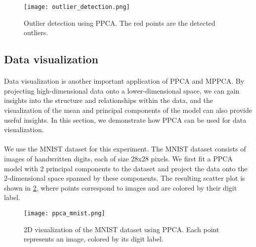 \documentclass{article}
\begin{document}
\begin{figure}[H]
    \centering
    \texttt{[image: outlier\_detection.png]}
    \caption{Outlier detection using PPCA. The red points are the detected outliers.}
    \label{fig:outlier_detection}
\end{figure}

\subsection{Data visualization}




\paragraph{} Data visualization is another important application of PPCA and MPPCA. By projecting high-dimensional data onto a lower-dimensional space, we can gain insights into the structure and relationships within the data, and the visualization of the mean and principal components of the model can also provide useful insights. In this section, we demonstrate how PPCA can be used for data visualization.

\paragraph{} We use the MNIST dataset for this experiment. The MNIST dataset consists of images of handwritten digits, each of size 28x28 pixels. We first fit a PPCA model with 2 principal components to the dataset and project the data onto the 2-dimensional space spanned by these components. The resulting scatter plot is shown in \cref{fig:ppca_mnist}, where points correspond to images and are colored by their digit label.

\begin{figure}[H]
    \centering
    \texttt{[image: ppca\_mnist.png]}
    \caption{2D visualization of the MNIST dataset using PPCA. Each point represents an image, colored by its digit label.}
    \label{fig:ppca_mnist}
\end{figure}
\end{document}

